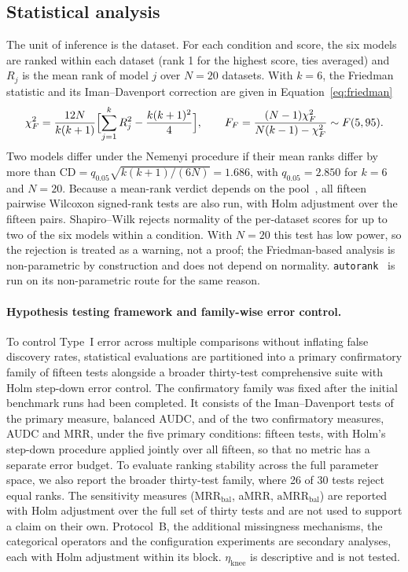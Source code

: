 \documentclass[pdflatex,sn-mathphys]{sn-jnl}
\theoremstyle{thmstyleone}
\theoremstyle{thmstyletwo}
\theoremstyle{thmstylethree}
\newcommand{\MRR}{\mathrm{MRR}}
\newcommand{\aMRR}{\mathrm{aMRR}}
\newcommand{\etaknee}{\eta_{\mathrm{knee}}}
\begin{document}
\subsection{Statistical analysis}\label{sec:method:stats}

The unit of inference is the dataset. For each condition and score, the six models are ranked within each dataset (rank 1 for the highest score, ties averaged) and $R_j$ is the mean rank of model $j$ over $N=20$ datasets. With $k=6$, the Friedman statistic and its Iman--Davenport correction are given in Equation~\eqref{eq:friedman}
\begin{equation}\label{eq:friedman}
\chi^{2}_{F}=\frac{12N}{k(k+1)}\Bigl[\sum_{j=1}^{k}R_j^{2}-\frac{k(k+1)^{2}}{4}\Bigr],\qquad
F_F=\frac{(N-1)\chi^{2}_{F}}{N(k-1)-\chi^{2}_{F}}\sim F(5,95).
\end{equation}
Two models differ under the Nemenyi procedure if their mean ranks differ by more than $\mathrm{CD}=q_{0.05}\sqrt{k(k+1)/(6N)}=1.686$, with $q_{0.05}=2.850$ for $k=6$ and $N=20$. Because a mean-rank verdict depends on the pool~\cite{benavoli2016should}, all fifteen pairwise Wilcoxon signed-rank tests are also run, with Holm adjustment over the fifteen pairs. Shapiro--Wilk rejects normality of the per-dataset scores for up to two of the six models within a condition. With $N=20$ this test has low power, so the rejection is treated as a warning, not a proof; the Friedman-based analysis is non-parametric by construction and does not depend on normality. \texttt{autorank}~\cite{herbold2020autorank} is run on its non-parametric route for the same reason.

\paragraph{Hypothesis testing framework and family-wise error control.} To control Type~I error across multiple comparisons without inflating false discovery rates, statistical evaluations are partitioned into a primary confirmatory family of fifteen tests alongside a broader thirty-test comprehensive suite with Holm step-down error control. The confirmatory family was fixed after the initial benchmark runs had been completed. It consists of the Iman--Davenport tests of the primary measure, balanced AUDC, and of the two confirmatory measures, AUDC and MRR, under the five primary conditions: fifteen tests, with Holm's step-down procedure applied jointly over all fifteen, so that no metric has a separate error budget. To evaluate ranking stability across the full parameter space, we also report the broader thirty-test family, where 26 of 30 tests reject equal ranks. The sensitivity measures ($\MRR_{\mathrm{bal}}$, aMRR, $\aMRR_{\mathrm{bal}}$) are reported with Holm adjustment over the full set of thirty tests and are not used to support a claim on their own. Protocol~B, the additional missingness mechanisms, the categorical operators and the configuration experiments are secondary analyses, each with Holm adjustment within its block. $\etaknee$ is descriptive and is not tested.
\end{document}
